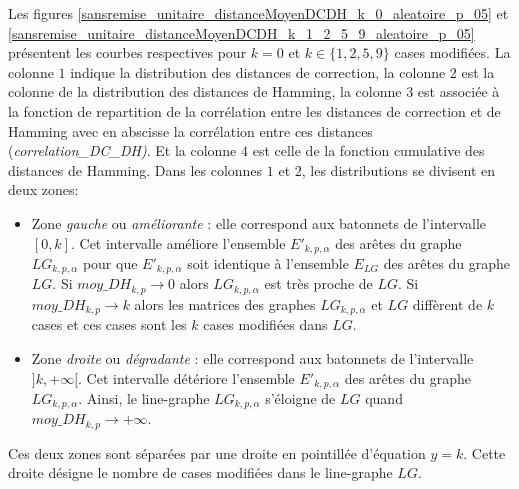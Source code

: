 Les figures \ref{sansremise_unitaire_distanceMoyenDCDH_k_0_aleatoire_p_05} et \ref{sansremise_unitaire_distanceMoyenDCDH_k_1_2_5_9_aleatoire_p_05} pr\'esentent les courbes respectives pour $k=0$ et $k \in \{1,2,5,9\}$ cases modifi\'ees. 
La colonne $1$ indique la distribution des distances de correction, la colonne $2$ est la colonne de la distribution des distances de Hamming, la colonne $3$ est associ\'ee \`a la fonction de repartition de la corr\'elation entre les distances de correction et de Hamming avec en abscisse la corr\'elation entre ces distances ({\em correlation\_DC\_DH)}. 
Et la colonne $4$ est celle de la fonction cumulative des distances de Hamming.
Dans les colonnes $1$ et $2$, les distributions se divisent en deux zones: 
\begin{itemize}
\item Zone {\em gauche} ou {\em am\'eliorante} : elle correspond aux batonnets de l'intervalle $[0,k]$. Cet intervalle  am\'eliore l'ensemble $E'_{k,p,\alpha}$ des ar\^etes du graphe $LG_{k,p,\alpha}$ pour que $E'_{k,p,\alpha}$ soit identique \`a l'ensemble $E_{LG}$ des ar\^etes du graphe $LG$. Si $moy\_DH_{k,p} \rightarrow 0$ alors $LG_{k,p,\alpha}$ est tr\`es proche de $LG$. Si $moy\_DH_{k,p} \rightarrow k$ alors les matrices des graphes $LG_{k,p,\alpha}$ et $LG$ diff\`erent de $k$ cases et ces cases sont les $k$ cases modifi\'ees dans $LG$.
\item Zone {\em droite} ou {\em d\'egradante} : elle correspond aux batonnets de l'intervalle $]k, +\infty[$. Cet intervalle d\'et\'eriore  l'ensemble $E'_{k,p,\alpha}$ des ar\^etes du graphe $LG_{k,p,\alpha}$. Ainsi, le line-graphe $LG_{k,p,\alpha}$ s'\'eloigne de $LG$ quand $moy\_DH_{k,p} \rightarrow +\infty$.
\end{itemize}
Ces deux zones sont s\'epar\'ees par une droite en pointill\'ee d'\'equation $y = k$.  Cette droite d\'esigne le nombre de cases modifi\'ees dans le line-graphe $LG$.
\newline

